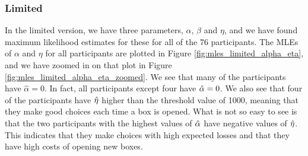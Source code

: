 \subsubsection{Limited}
In the limited version, we have three parameters, $\alpha$, $\beta$ and $\eta$, and we have found maximum likelihood estimates for these for all of the 76 participants. The MLEs of $\alpha$ and $\eta$ for all participants are plotted in Figure \ref{fig:mles_limited_alpha_eta}, and we have zoomed in on that plot in Figure \ref{fig:mles_limited_alpha_eta_zoomed}. We see that many of the participants have $\hat{\alpha}=0$. In fact, all participants except four have $\hat{\alpha}=0$. We also see that four of the participants have $\hat{\eta}$ higher than the threshold value of 1000, meaning that they make good choices each time a box is opened. What is not so easy to see is that the two participants with the highest values of $\hat{\alpha}$ have negative values of $\hat{\eta}$. This indicates that they make choices with high expected losses and that they have high costs of opening new boxes. 
